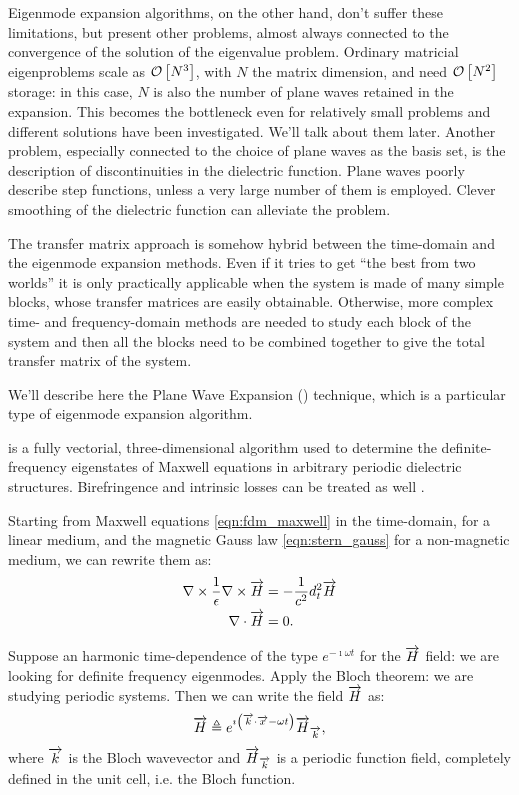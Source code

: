 Eigenmode expansion algorithms, on the other hand, don't suffer these
limitations, but present other problems, almost always connected to
the convergence of the solution of the eigenvalue problem. Ordinary
matricial eigenproblems scale as $\mathcal{O}\left[N^3\right]$, with $N$ the matrix
dimension, and need $\mathcal{O}\left[N^2\right]$ storage: in this case, $N$ is also
the number of plane waves retained in the expansion. This becomes the
bottleneck even for relatively small problems and different solutions
have been investigated. We'll talk about them later. Another problem,
especially connected to the choice of plane waves as the basis set, is
the description of discontinuities in the dielectric function. Plane
waves poorly describe step functions, unless a very large number of
them is employed. Clever smoothing of the dielectric function can
alleviate the problem.

The transfer matrix approach is somehow hybrid between the time-domain
and the eigenmode expansion methods. Even if it tries to get ``the
best from two worlds'' it is only practically applicable when the
system is made of many simple blocks, whose transfer matrices are
easily obtainable. Otherwise, more complex time- and frequency-domain
methods are needed to study each block of the system and then all the
blocks need to be combined together to give the total transfer matrix
of the system.

We'll describe here the Plane Wave Expansion (\PWE) technique, which
is a particular type of eigenmode expansion algorithm.

\PWE{} is a fully vectorial, three-dimensional algorithm used to
determine the definite-frequency eigenstates of Maxwell equations in
arbitrary periodic dielectric structures. Birefringence and intrinsic
losses can be treated as well \cite{johnson_block}.

Starting from Maxwell equations \eqref{eqn:fdm_maxwell} in the
time-domain, for a linear medium, and the magnetic Gauss law
\eqref{eqn:stern_gauss} for a non-magnetic medium, we can rewrite
them as:
\begin{align}
{\nabla\times \frac{1}{\epsilon}{\nabla\times \overrightarrow{H}}} & = -\frac{1}{c^2} d_t^2 \overrightarrow{H} \label{eqn:pwe_helmholtz} \\
{\nabla \cdot \overrightarrow{H}} & = 0 \label{eqn:pwe_divergence}.
\end{align}

Suppose an harmonic time-dependence of the type $e^{-\imath \omega
  t}$ for the $\overrightarrow{H}$ field: we are looking for definite frequency
eigenmodes. Apply the Bloch theorem: we are studying periodic
systems. Then we can write the field $\overrightarrow{H}$ as:
\begin{equation} \label{eqn:pwe_bloch}
\overrightarrow{H} \triangleq e^{\imath\left({\overrightarrow{k} \cdot \overrightarrow{x}} - \omega t\right)} \overrightarrow{H}_{\overrightarrow{k}},
\end{equation}
where $\overrightarrow{k}$ is the Bloch wavevector and $\overrightarrow{H}_{\overrightarrow{k}}$ is a periodic
function field, completely defined in the unit cell, i.e. the Bloch
function.

